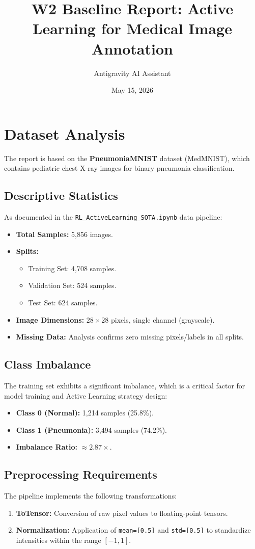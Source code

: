 \documentclass[a4paper,12pt]{article}
\title{W2 Baseline Report: Active Learning for Medical Image Annotation}
\author{Antigravity AI Assistant}
\date{May 15, 2026}
\begin{document}
\maketitle

\section{Dataset Analysis}
The report is based on the \textbf{PneumoniaMNIST} dataset (MedMNIST), which contains pediatric chest X-ray images for binary pneumonia classification.

\subsection{Descriptive Statistics}
As documented in the \texttt{RL\_ActiveLearning\_SOTA.ipynb} data pipeline:
\begin{itemize}
    \item \textbf{Total Samples:} 5,856 images.
    \item \textbf{Splits:} 
    \begin{itemize}
        \item Training Set: 4,708 samples.
        \item Validation Set: 524 samples.
        \item Test Set: 624 samples.
    \end{itemize}
    \item \textbf{Image Dimensions:} $28 \times 28$ pixels, single channel (grayscale).
    \item \textbf{Missing Data:} Analysis confirms zero missing pixels/labels in all splits.
\end{itemize}

\subsection{Class Imbalance}
The training set exhibits a significant imbalance, which is a critical factor for model training and Active Learning strategy design:
\begin{itemize}
    \item \textbf{Class 0 (Normal):} 1,214 samples (25.8\%).
    \item \textbf{Class 1 (Pneumonia):} 3,494 samples (74.2\%).
    \item \textbf{Imbalance Ratio:} $\approx 2.87\times$.
\end{itemize}

\subsection{Preprocessing Requirements}
The pipeline implements the following transformations:
\begin{enumerate}
    \item \textbf{ToTensor:} Conversion of raw pixel values to floating-point tensors.
    \item \textbf{Normalization:} Application of \texttt{mean=[0.5]} and \texttt{std=[0.5]} to standardize intensities within the range $[-1, 1]$.
\end{enumerate}
\end{document}
